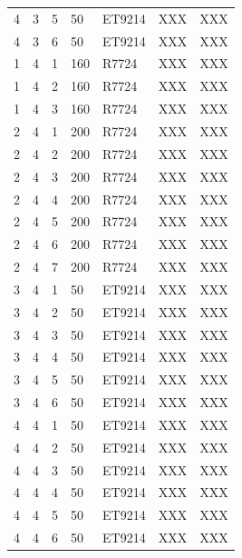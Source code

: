 \documentclass[3p,final,twocolumn]{elsarticle}
\begin{document}
\begin{table}[ht]
\begin{tabular}{  m{3em} | m{3em} | m{5em} | m{3em} | m{3em} | m{3em} | m{8em} }
4	&3	&5	&50	&ET9214	&XXX	&XXX\\ 
4	&3	&6	&50	&ET9214	&XXX	&XXX\\ 
1	&4	&1	&160	&R7724	&XXX	&XXX\\ 
1	&4	&2	&160	&R7724	&XXX	&XXX\\ 
1	&4	&3	&160	&R7724	&XXX	&XXX\\ 
2	&4	&1	&200	&R7724	&XXX	&XXX\\ 
2	&4	&2	&200	&R7724	&XXX	&XXX\\ 
2	&4	&3	&200	&R7724	&XXX	&XXX\\ 
2	&4	&4	&200	&R7724	&XXX	&XXX\\ 
2	&4	&5	&200	&R7724	&XXX	&XXX\\ 
2	&4	&6	&200	&R7724	&XXX	&XXX\\ 
2	&4	&7	&200	&R7724	&XXX	&XXX\\ 
3	&4	&1	&50	&ET9214	&XXX	&XXX\\ 
3	&4	&2	&50	&ET9214	&XXX	&XXX\\ 
3	&4	&3	&50	&ET9214	&XXX	&XXX\\ 
3	&4	&4	&50	&ET9214	&XXX	&XXX\\ 
3	&4	&5	&50	&ET9214	&XXX	&XXX\\ 
3	&4	&6	&50	&ET9214	&XXX	&XXX\\ 
4	&4	&1	&50	&ET9214	&XXX	&XXX\\ 
4	&4	&2	&50	&ET9214	&XXX	&XXX\\ 
4	&4	&3	&50	&ET9214	&XXX	&XXX\\ 
4	&4	&4	&50	&ET9214	&XXX	&XXX\\ 
4	&4	&5	&50	&ET9214	&XXX	&XXX\\ 
4	&4	&6	&50	&ET9214	&XXX	&XXX\\ 
		\hline
	\end{tabular}
\end{table}
\end{document}

